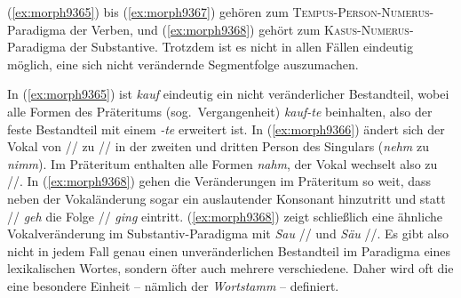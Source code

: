 \begin{exe}
  \ex \label{ex:morph9365}
  \begin{xlist}
  \end{xlist}
  \ex \label{ex:morph9366}
  \begin{xlist}
  \end{xlist}
  \ex \label{ex:morph9367}
  \begin{xlist}
  \end{xlist}
  \ex \label{ex:morph9368}
  \begin{xlist}
  \end{xlist}
\end{exe}

(\ref{ex:morph9365}) bis (\ref{ex:morph9367}) gehören zum \textsc{Tempus}-\textsc{Person}-\textsc{Numerus}-Paradigma der Verben, und (\ref{ex:morph9368}) gehört zum \textsc{Kasus}-\textsc{Numerus}-Paradigma der Substantive.
Trotzdem ist es nicht in allen Fällen eindeutig möglich, eine sich nicht verändernde Segmentfolge auszumachen.

In (\ref{ex:morph9365}) ist \textit{kauf} eindeutig ein nicht veränderlicher Bestandteil, wobei alle Formen des Präteritums (sog.\ Vergangenheit) \textit{kauf-te} beinhalten, also der feste Bestandteil mit einem \textit{-te} erweitert ist.
In (\ref{ex:morph9366}) ändert sich der Vokal von // zu // in der zweiten und dritten Person des Singulars (\textit{nehm} zu \textit{nimm}).
Im Präteritum enthalten alle Formen \textit{nahm}, der Vokal wechselt also zu //.
In (\ref{ex:morph9368}) gehen die Veränderungen im Präteritum so weit, dass neben der Vokaländerung sogar ein auslautender Konsonant hinzutritt und statt // \textit{geh} die Folge // \textit{ging} eintritt.
(\ref{ex:morph9368}) zeigt schließlich eine ähnliche Vokalveränderung im Substantiv-Paradigma mit \textit{Sau} // und \textit{Säu} //.
Es gibt also nicht in jedem Fall genau einen unveränderlichen Bestandteil im Paradigma eines lexikalischen Wortes, sondern öfter auch mehrere verschiedene.
Daher wird oft die eine besondere Einheit -- nämlich der \textit{Wortstamm} -- definiert.

